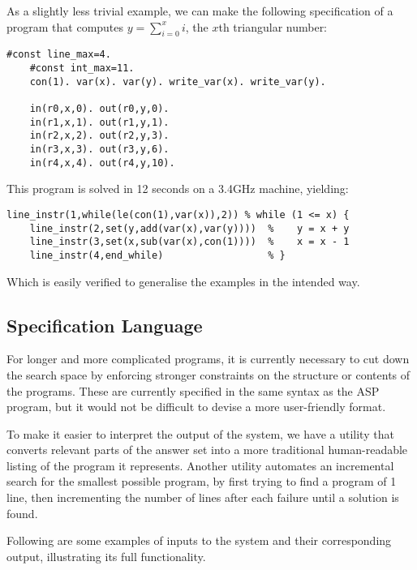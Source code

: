 \documentclass[a4paper,twoside,notitlepage]{article}
\begin{document}
As a slightly less trivial example, we can make the following 
specification of a program that computes $y = \sum_{i=0}^x i$, the $x$th 
triangular number:
\begin{Verbatim}[samepage=true]
    #const line_max=4.
    #const int_max=11. 
    con(1). var(x). var(y). write_var(x). write_var(y).
    
    in(r0,x,0). out(r0,y,0).
    in(r1,x,1). out(r1,y,1).
    in(r2,x,2). out(r2,y,3).
    in(r3,x,3). out(r3,y,6).
    in(r4,x,4). out(r4,y,10).
\end{Verbatim}
This program is solved in 12 seconds on a 3.4GHz machine, yielding:
\begin{Verbatim}[samepage=true]
    line_instr(1,while(le(con(1),var(x)),2)) % while (1 <= x) {
    line_instr(2,set(y,add(var(x),var(y))))  %    y = x + y
    line_instr(3,set(x,sub(var(x),con(1))))  %    x = x - 1
    line_instr(4,end_while)                  % }
\end{Verbatim}
Which is easily verified to generalise the examples in the intended way.

\subsection{Specification Language} \label{sec:inplng}
For longer and more complicated programs, it is currently necessary to cut 
down the search space by enforcing stronger constraints on the structure 
or contents of the programs. These are currently specified in the same 
syntax as the ASP program, but it would not be difficult to devise a more 
user-friendly format.

To make it easier to interpret the output of the system, we have a utility 
that converts relevant parts of the answer set into a more traditional 
human-readable listing of the program it represents. Another utility 
automates an incremental search for the smallest possible program, by 
first trying to find a program of 1 line, then incrementing the number of 
lines after each failure until a solution is found.

Following are some examples of inputs to the system and their 
corresponding output, illustrating its full functionality.
\end{document}
